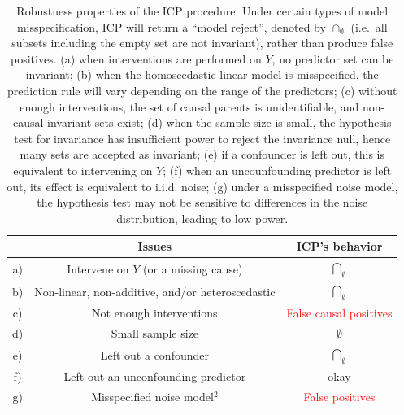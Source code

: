 \documentclass{article}
\begin{document}
\begin{table}[h]
\centering
  \begin{tabular}{c|c|c|}
    \hline
    &\textbf{Issues} & \textbf{ICP's behavior} \\
    \hline
    a) & Intervene on $Y$ (or a missing cause) &
    $\underset{\emptyset}{\bigcap}$ \\
    \hline
    b) & Non-linear, non-additive, and/or heteroscedastic &
    $\underset{\emptyset}{\bigcap}$ \\
    \hline
    c) & Not enough interventions &
    \textcolor{red}{False causal positives} \\
    \hline
    d) & Small sample size &
    $\emptyset$ \\
    \hline
    e) & Left out a confounder & $\underset{\emptyset}{\bigcap}$ \\
    \hline
    f) & Left out an unconfounding predictor & okay  \\
    \hline
    g) & Misspecified noise model$^2$ & \textcolor{red}{False positives}\\\hline
  \end{tabular}
\caption{Robustness properties of the ICP procedure.  Under certain types
  of model misspecification, ICP will return a ``model reject'',
  denoted by $\cap_{\emptyset}$ (i.e.\ all subsets including the empty
  set are not invariant), rather than produce false positives.
(a) when interventions are performed on $Y$, no predictor set can be invariant;
(b) when the homoscedastic linear model is misspecified, the prediction rule
will vary depending on the range of the predictors; (c) without enough interventions,
the set of causal parents is unidentifiable, and non-causal invariant sets exist;
(d) when the sample size is small, the hypothesis test for invariance has insufficient power to reject the invariance null,
hence many sets are accepted as invariant;
(e) if a confounder is left out, this is equivalent to intervening on $Y$;
(f) when an uncounfounding predictor is left out, its effect is equivalent to i.i.d. noise;
(g) under a misspecified noise model, the hypothesis test may not be sensitive to differences in the noise distribution,
leading to low power.
}
\label{tab:icp}
\end{table}




\end{document}
